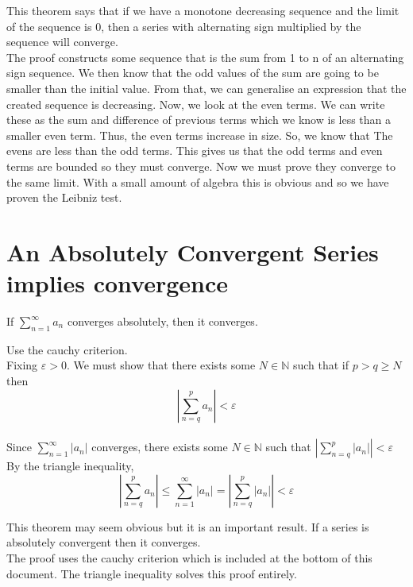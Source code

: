 \documentclass[12pt]{article}
\begin{document}
\begin{explanation}{}
    This theorem says that if we have a monotone decreasing sequence and the limit of the sequence is 0, then a series with alternating sign multiplied by the sequence will converge.\\
The proof constructs some sequence that is the sum from 1 to n of an alternating sign sequence. We then know that the odd values of the sum are going to be smaller than the initial value. From that, we can generalise an expression that the created sequence is decreasing. Now, we look at the even terms. We can write these as the sum and difference of previous terms which we know is less than a smaller even term. Thus, the even terms increase in size. So, we know that The evens are less than the odd terms. This gives us that the odd terms and even terms are bounded so they must converge. Now we must prove they converge to the same limit. With a small amount of algebra this is obvious and so we have proven the Leibniz test.\\
\end{explanation}


\section{An Absolutely Convergent Series implies convergence}
\begin{theo}{}
If \(\displaystyle\sum_{n=1}^\infty a_n\) converges absolutely, then it converges.   
\end{theo}
\begin{prf}{}
Use the cauchy criterion.\\
Fixing \(\varepsilon > 0\). We must show that there exists some \(N \in \mathbb N\) such that if \(p > q \ge N\) then \[\left|\displaystyle\sum_{n = q}^p a_n\right| < \varepsilon\]\\
Since \(\displaystyle\sum_{n=1}^\infty |a_n|\) converges, there exists some \(N \in \mathbb N\) such that \(\left|\displaystyle\sum_{n = q}^p |a_n|\right| < \varepsilon\)\\
By the triangle inequality, \[\left|\displaystyle\sum_{n = q}^p a_n\right| \le \displaystyle\sum_{n=1}^\infty |a_n| = \left|\displaystyle\sum_{n = q}^p |a_n|\right| < \varepsilon \]
\end{prf}
\newpage
\begin{explanation}{}
    This theorem may seem obvious but it is an important result. If a series is absolutely convergent then it converges.\\
The proof uses the cauchy criterion which is included at the bottom of this document. The triangle inequality solves this proof entirely.\\
\end{explanation}
\end{document}
